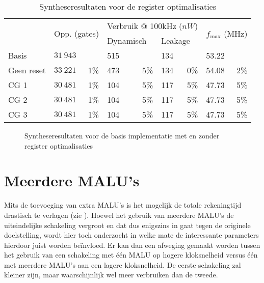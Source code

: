 \begin{table}[h]
	\caption{Syntheseresultaten voor de register optimalisaties}
	\label{tabel-resultaten-optimalisaties}

	\centering
	\begin{tabular}{|l|lr|lr|lr|lr|}
		\hline
		& \multicolumn{2}{l|}{\multirow{2}{*}{Opp. (gates)}}	& \multicolumn{4}{c|}{Verbruik @ 100kHz ($nW$)}	& \multicolumn{2}{l|}{\multirow{2}{*}{$f_{\text{max}}$ (MHz)}}\\
		\cline{4-7}
		&	& & \multicolumn{2}{l|}{Dynamisch}	& \multicolumn{2}{l|}{Leakage}	& &\\
		\hline \hline
		Basis			& $31\:943$	& & 515	& 	& 134 & 	& 53.22 & \\
		\hline
		Geen reset	& $33\:221$	& 1\%	& 473	& 5\%	& 134 & 0\%	& 54.08	& 2\%\\
		CG 1			& $30\:481$	& 1\%	& 104	& 5\%	& 117	& 5\%	& 47.73	& 5\%\\
		CG 2			& $30\:481$	& 1\%	& 104	& 5\%	& 117	& 5\%	& 47.73	& 5\%\\
		CG 3			& $30\:481$	& 1\%	& 104	& 5\%	& 117	& 5\%	& 47.73	& 5\%\\
		\hline		
	\end{tabular}
\end{table}

\begin{figure}[h]
	\centering
		\caption{Syntheseresultaten voor de basis implementatie met en zonder register optimalisaties\label{figuur-resultaten-m1}}
\end{figure}

\section{Meerdere MALU's\label{sectie-resulaten-malus}}

Mits de toevoeging van extra MALU's is het mogelijk de totale rekeningtijd drastisch te verlagen (zie ). Hoewel het gebruik van meerdere MALU's de uiteindelijke schakeling vergroot en dat dus enigszins in gaat tegen de originele doelstelling, wordt hier toch onderzocht in welke mate de interessante parameters hierdoor juist worden be\"invloed. Er kan dan een afweging gemaakt worden tussen het gebruik van een schakeling met \'e\'en MALU op hogere kloksnelheid versus \'e\'en met meerdere MALU's aan een lagere kloksnelheid. De eerste schakeling zal kleiner zijn, maar waarschijnlijk wel meer verbruiken dan de tweede.

